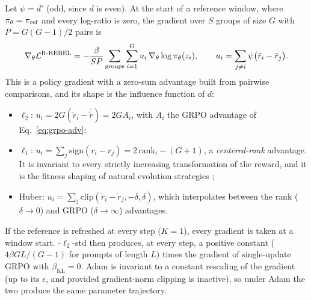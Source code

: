 \begin{proposition}
\label{prop:firstorder}
Let $\psi = d'$ (odd, since $d$ is even). At the start of a reference window,
where $\pi_\theta = \pi_{\mathrm{ref}}$ and every log-ratio is zero, the \rrebel{} gradient over
$S$ groups of size $G$ with $P = G(G-1)/2$ pairs is
\begin{equation}
  \nabla_\theta \mathcal{L}^{\text{R-REBEL}}
  = -\frac{\beta}{S P}\sum_{\text{groups}}\sum_{i=1}^{G}
     u_i\,\nabla_\theta \log\pi_\theta(z_i),
  \qquad
  u_i = \sum_{j\neq i}\psi\bigl(\tilde r_i - \tilde r_j\bigr).
  \label{eq:th-firstorder}
\end{equation}
This is a policy gradient with a zero-sum advantage built from pairwise
comparisons, and its shape is the influence function of $d$:
\begin{itemize}[itemsep=1pt,topsep=2pt]
  \item $\ell_2$: $u_i = 2G(\tilde r_i - \overline{\tilde r}) = 2G A_i$, with
        $A_i$ the GRPO advantage of Eq.~\eqref{eq:grpo-adv};
  \item $\ell_1$: $u_i = \sum_{j}\mathrm{sign}(r_i - r_j) = 2\,\mathrm{rank}_i - (G+1)$,
        a \emph{centered-rank} advantage. It is invariant to every strictly
        increasing transformation of the reward, and it is the fitness shaping
        of natural evolution strategies \citep{wierstra2014nes,salimans2017es};
  \item Huber: $u_i = \sum_j \mathrm{clip}(\tilde r_i - \tilde r_j, -\delta, \delta)$,
        which interpolates between the rank ($\delta\to0$) and GRPO
        ($\delta\to\infty$) advantages.
\end{itemize}
\end{proposition}

\begin{corollary}
\label{cor:grpo}
If the reference is refreshed at every step ($K=1$), every gradient is taken at
a window start. \rrebel{}-$\ell_2$-std then produces, at every step, a positive
constant ($4\beta G L/(G-1)$ for prompts of length $L$) times the gradient of
single-update GRPO with $\beta_{\mathrm{KL}} = 0$. Adam is invariant to a
constant rescaling of the gradient (up to its $\epsilon$, and provided
gradient-norm clipping is inactive), so under Adam the two produce the same
parameter trajectory.
\end{corollary}

